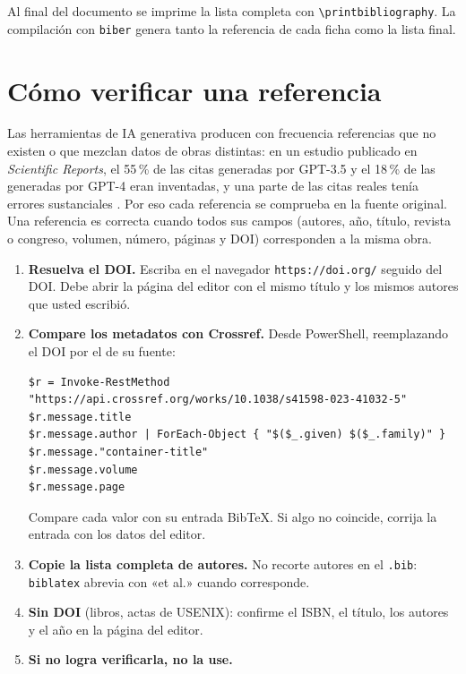 \documentclass[11pt,a4paper]{article}
\begin{document}
Al final del documento se imprime la lista completa con \verb|\printbibliography|. La compilación con \texttt{biber} genera tanto la referencia de cada ficha como la lista final.

\section{Cómo verificar una referencia}\label{sec:verificar}

Las herramientas de IA generativa producen con frecuencia referencias que no existen o que mezclan datos de obras distintas: en un estudio publicado en \emph{Scientific Reports}, el 55\,\% de las citas generadas por GPT-3.5 y el 18\,\% de las generadas por GPT-4 eran inventadas, y una parte de las citas reales tenía errores sustanciales \cite{walters2023fabrication}. Por eso cada referencia se comprueba en la fuente original. Una referencia es correcta cuando todos sus campos (autores, año, título, revista o congreso, volumen, número, páginas y DOI) corresponden a la misma obra.

\begin{enumerate}
	\item \textbf{Resuelva el DOI.} Escriba en el navegador \texttt{https://doi.org/} seguido del DOI. Debe abrir la página del editor con el mismo título y los mismos autores que usted escribió.
	\item \textbf{Compare los metadatos con Crossref.} Desde PowerShell, reemplazando el DOI por el de su fuente:
	\begin{lstlisting}
$r = Invoke-RestMethod "https://api.crossref.org/works/10.1038/s41598-023-41032-5"
$r.message.title
$r.message.author | ForEach-Object { "$($_.given) $($_.family)" }
$r.message."container-title"
$r.message.volume
$r.message.page
	\end{lstlisting}
	Compare cada valor con su entrada BibTeX. Si algo no coincide, corrija la entrada con los datos del editor.
	\item \textbf{Copie la lista completa de autores.} No recorte autores en el \texttt{.bib}: \texttt{biblatex} abrevia con «et al.» cuando corresponde.
	\item \textbf{Sin DOI} (libros, actas de USENIX): confirme el ISBN, el título, los autores y el año en la página del editor.
	\item \textbf{Si no logra verificarla, no la use.}
\end{enumerate}
\end{document}

